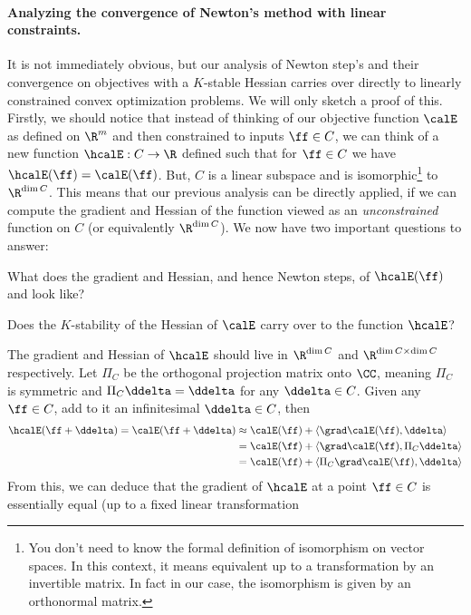 \paragraph{Analyzing the convergence of Newton's method with linear
  constraints.}
It is not immediately obvious, but our analysis of Newton step's and
their convergence on objectives with a $K$-stable Hessian carries over
directly to linearly constrained convex optimization
problems.
We will only sketch a proof of this.
Firstly, we should notice that instead of thinking of our objective function
$\calE$ as defined on $\R^m$ and then constrained to inputs $\ff \in
C$, we can think of a new function $\hcalE: C \to \R$ defined such
that for $\ff \in C$ we have $\hcalE(\ff) = \calE(\ff)$.
But, $C$ is a linear subspace and is isomorphic\footnote{You don't
  need to know the formal definition of isomorphism on vector
  spaces. In this context, it means equivalent up to a
  transformation by an invertible matrix. In fact in our case, the isomorphism
is given by an orthonormal matrix.} to $\R^{\dim{C}}$.
This means that our previous analysis can be directly applied, if we
can compute the gradient and Hessian of the function viewed as an
\emph{unconstrained} function on $C$ (or equivalently
$\R^{\dim{C}}$).
We now have two important questions to answer:
\begin{tight_enumerate}
\item What does the gradient and Hessian, and hence Newton steps, of
  $\hcalE(\ff)$ and look like? 
\item Does the $K$-stability of the Hessian of $\calE$ carry over to
  the function $\hcalE$?
\end{tight_enumerate}
The gradient and Hessian of $\hcalE$ should live in $\R^{\dim C}$ and
$\R^{\dim C \times \dim C}$ respectively.
Let $\Pi_C$ be the orthogonal projection matrix onto $\CC$, meaning $\Pi_C$ is symmetric and $\Pi_C\ddelta=\ddelta$ for any $\ddelta\in C$.
Given any $\ff \in C$, add to it an infinitesimal $\ddelta\in C$, then
\begin{align*}
  \hcalE(\ff+\ddelta)=
  \calE(\ff+\ddelta) &\approx \calE(\ff) + \langle\grad\calE(\ff),\ddelta\rangle \\
  &= \calE(\ff) + \langle\grad\calE(\ff),\Pi_C\ddelta\rangle \\
 &= \calE(\ff) + \langle\Pi_C\grad\calE(\ff),\ddelta\rangle
\end{align*}
From this, we can deduce that the gradient of $\hcalE$ at a point
$\ff\in C$ is essentially equal (up to a fixed linear transformation

